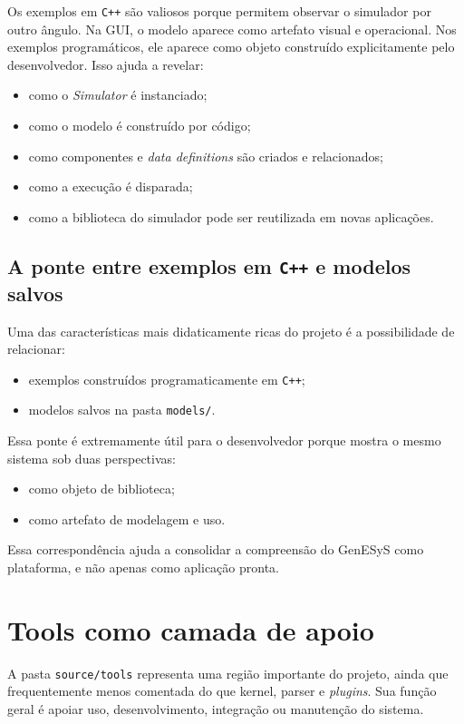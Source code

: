 Os exemplos em \texttt{C++} são valiosos porque permitem observar o simulador por outro ângulo. Na GUI, o modelo aparece como artefato visual e operacional. Nos exemplos programáticos, ele aparece como objeto construído explicitamente pelo desenvolvedor. Isso ajuda a revelar:
\begin{itemize}
    \item como o \textit{Simulator} é instanciado;
    \item como o modelo é construído por código;
    \item como componentes e \textit{data definitions} são criados e relacionados;
    \item como a execução é disparada;
    \item como a biblioteca do simulador pode ser reutilizada em novas aplicações.
\end{itemize}

\subsection{A ponte entre exemplos em \texttt{C++} e modelos salvos}
\label{subsec:cap10_ponte_exemplos_cpp_modelos_salvos}

Uma das características mais didaticamente ricas do projeto é a possibilidade de relacionar:
\begin{itemize}
    \item exemplos construídos programaticamente em \texttt{C++};
    \item modelos salvos na pasta \texttt{models/}.
\end{itemize}

Essa ponte é extremamente útil para o desenvolvedor porque mostra o mesmo sistema sob duas perspectivas:
\begin{itemize}
    \item como objeto de biblioteca;
    \item como artefato de modelagem e uso.
\end{itemize}

Essa correspondência ajuda a consolidar a compreensão do GenESyS como plataforma, e não apenas como aplicação pronta.

\section{Tools como camada de apoio}
\label{sec:cap10_tools_como_camada_apoio}

A pasta \texttt{source/tools} representa uma região importante do projeto, ainda que frequentemente menos comentada do que kernel, parser e \textit{plugins}. Sua função geral é apoiar uso, desenvolvimento, integração ou manutenção do sistema.

